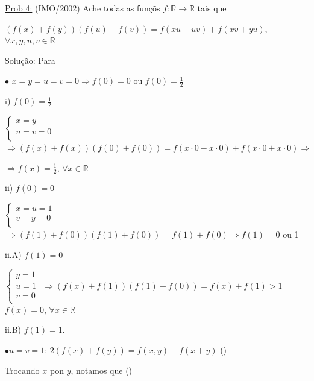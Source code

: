 \documentclass[a4paper,12pt]{article}
\theoremstyle{plain} %
\theoremstyle{definition} %
\theoremstyle{remark} %
\begin{document}
	\vspace{2ex}\underline{Prob 4:} (IMO/2002) Ache todas as fun\c{c}\~os $f:\mathds{R}\rightarrow\mathds{R}$ tais que
	
	\begin{center}
		$(f(x)+f(y))(f(u)+f(v))=f(xu-uv)+f(xv+yu)$, $\forall x, y, u, v \in\mathds{R}$
	\end{center}
	
	\begin{framed}
		\underline{Solu\c{c}\~ao:} Para
		
		$\bullet$ \hspace{1em} $x=y=u=v=0\Rightarrow f(0)=0$ ou $f(0)=\frac{1}{2}$
		
		i) $f(0)=\frac{1}{2}$
		
		$\left\{
		\begin{array}{lcl}
			x=y\\
			u=v=0\\
		\end{array}
		\right.$ $\Rightarrow (f(x)+f(x))(f(0)+f(0))=f(x\cdot 0-x\cdot 0)+f(x\cdot 0+x\cdot 0)\Rightarrow$
		
		\begin{center}
			$\Rightarrow f(x)=\frac{1}{2}$, $\forall x\in\mathds{R}$
		\end{center}
		
		ii) $f(0)=0$
		
		$\left\{
		\begin{array}{lcl}
			x=u=1\\
			v=y=0\\
		\end{array}
		\right.$ $\Rightarrow (f(1)+f(0))(f(1)+f(0))=f(1)+f(0)\Rightarrow f(1)=0$ ou 1
		
		ii.A) $f(1)=0$
		
		$\left\{
		\begin{array}{lc}
			y=1\\
			u=1\\
			v=0\\
		\end{array}
		\right.$ $\Rightarrow (f(x)+f(1))(f(1)+f(0))=f(x)+f(1)>1$ $f(x)=0$, $\forall x\in\mathds{R}$
		
		ii.B) $f(1)=1$.
		
		$\bullet$\hspace{1em}\underline{$u=v=1$:} $2(f(x)+f(y))=f(x,y)+f(x+y)$ (\textasteriskcentered)
		
		Trocando $x$ pon $y$, notamos que  \hfill (\textasteriskcentered\textasteriskcentered)
		

\end{framed}
\end{document}
